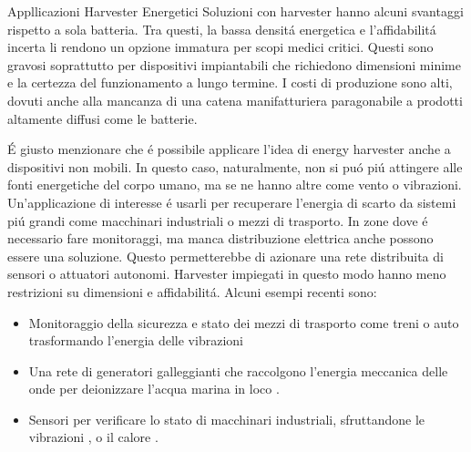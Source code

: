 \begin{section}{Appllicazioni Harvester Energetici}
    Soluzioni con harvester hanno alcuni svantaggi rispetto a sola batteria. Tra questi, la bassa densit\'a energetica e l'affidabilit\'a incerta li rendono un opzione immatura per scopi medici critici. Questi sono gravosi soprattutto per dispositivi impiantabili che richiedono dimensioni minime e la certezza del funzionamento a lungo termine. I costi di produzione sono alti, dovuti anche alla mancanza di una catena manifatturiera paragonabile a prodotti altamente diffusi come le batterie.

    \'E giusto menzionare che \'e possibile applicare l'idea di energy harvester anche a dispositivi non mobili. In questo caso, naturalmente, non si pu\'o pi\'u attingere alle fonti energetiche del corpo umano, ma se ne hanno altre come vento o vibrazioni. Un'applicazione di interesse \'e usarli per recuperare l'energia di scarto da sistemi pi\'u grandi come macchinari industriali o mezzi di trasporto. In zone dove \'e necessario fare monitoraggi, ma manca distribuzione elettrica anche possono essere una soluzione. Questo permetterebbe di azionare una rete distribuita di sensori o attuatori autonomi. Harvester impiegati in questo modo hanno meno restrizioni su dimensioni e affidabilit\'a. Alcuni esempi recenti sono: \begin{itemize}
        \item Monitoraggio della sicurezza e stato dei mezzi di trasporto come treni o auto trasformando l'energia delle vibrazioni \cite{liSmartRailwayTransportation, liuCompactHybridizedTriboelectricelectromagnetic2024}
        \item Una rete di generatori galleggianti che raccolgono l'energia meccanica delle onde per deionizzare l'acqua marina in loco \cite{renWavepoweredCapacitiveDeionization2024}. 
        \item Sensori per verificare lo stato di macchinari industriali, sfruttandone le vibrazioni \cite{alvarezruedaVibrationEnergyHarvesting2024, gaoHybridGeneratorEfficient2024}, o il calore \cite{deoliveiraDevelopmentHybridEnergy2024}.
    \end{itemize}
    
\end{section}
